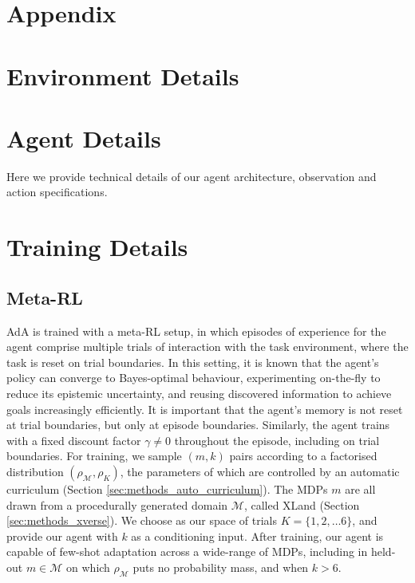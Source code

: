 \documentclass[11pt, a4paper, logo, copyright]{deepmind}
\begin{document}
\newpage
\begin{appendix}


\section*{Appendix}


\section{Environment Details}



\section{Agent Details}
Here we provide technical details of our agent architecture, observation and action specifications. 




\section{Training Details}
\label{app:training-details}
\subsection{Meta-RL}\label{appendix:metarl}

AdA is trained with a meta-RL setup, in which episodes of experience for the agent comprise multiple trials of interaction with the task environment, where the task is reset on trial boundaries. In this setting, it is known that the agent's policy can converge to Bayes-optimal behaviour, experimenting on-the-fly to reduce its epistemic uncertainty, and reusing discovered information to achieve goals increasingly efficiently. It is important that the agent's memory is not reset at trial boundaries, but only at episode boundaries. Similarly, the agent trains with a fixed discount factor $\gamma \neq 0$ throughout the episode, including on trial boundaries. For training, we sample $(m, k)$ pairs according to a factorised distribution $(\rho_{\mathcal{M}}, \rho_K)$, the parameters of which are controlled by an automatic curriculum (Section \ref{sec:methods_auto_curriculum}). The MDPs $m$ are all drawn from a procedurally generated domain $\mathcal{M}$, called XLand (Section \ref{sec:methods_xverse}). We choose as our space of trials $K = \{1,2, \dots 6\}$, and provide our agent with $k$ as a conditioning input. After training, our agent is capable of few-shot adaptation across a wide-range of MDPs, including in held-out $m \in \mathcal{M}$ on which $\rho_{\mathcal{M}}$ puts no probability mass, and when $k > 6$.


\end{appendix}
\end{document}

